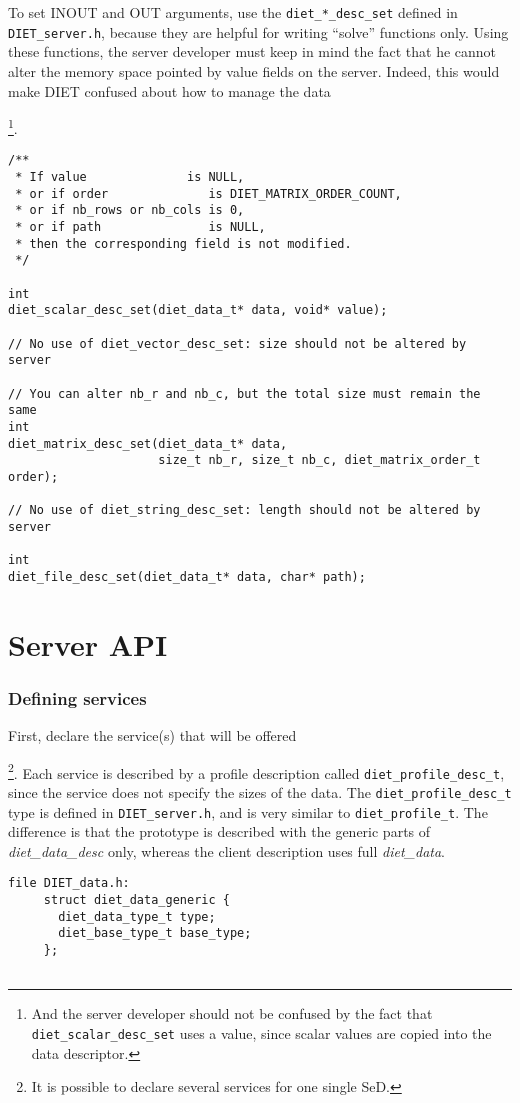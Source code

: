 To set INOUT and OUT arguments, use the \texttt{diet\_*\_desc\_set} defined
in \texttt{DIET\_server.h}, because they are helpful for writing ``solve''
functions only. Using these functions, the server developer must keep in
mind the fact that he cannot alter the memory space pointed by value fields
on the server. Indeed, this would make DIET confused about how to manage
the data{\footnote{And the server developer should not be confused by the
    fact that \texttt{diet\_scalar\_desc\_set} uses a value, since scalar
    values are copied into the data descriptor.}.

{\footnotesize
\begin{verbatim}
/**
 * If value              is NULL,
 * or if order              is DIET_MATRIX_ORDER_COUNT,
 * or if nb_rows or nb_cols is 0,
 * or if path               is NULL,
 * then the corresponding field is not modified.
 */

int
diet_scalar_desc_set(diet_data_t* data, void* value);

// No use of diet_vector_desc_set: size should not be altered by server

// You can alter nb_r and nb_c, but the total size must remain the same
int
diet_matrix_desc_set(diet_data_t* data,
                     size_t nb_r, size_t nb_c, diet_matrix_order_t order);

// No use of diet_string_desc_set: length should not be altered by server

int
diet_file_desc_set(diet_data_t* data, char* path);
\end{verbatim}
}


\section{Server API}
\label{sec:svAPI}


\subsubsection*{Defining services}

First, declare the service(s) that will be offered{\footnote{It is possible to
  declare several services for one single SeD.}.
Each service is described by a profile description called \texttt{diet\_profile\_desc\_t}, since the service does not specify the sizes of the data.
The \texttt{diet\_profile\_desc\_t} type is defined in \texttt{DIET\_server.h},
and is very similar to \texttt{diet\_profile\_t}. The difference is that the
prototype is described with the generic parts of \emph{diet\_data\_desc} only,
whereas the client description uses full \emph{diet\_data}.
{\footnotesize
\begin{verbatim}
file DIET_data.h:
     struct diet_data_generic {
       diet_data_type_t type;
       diet_base_type_t base_type;
     };


\end{verbatim}}}}
